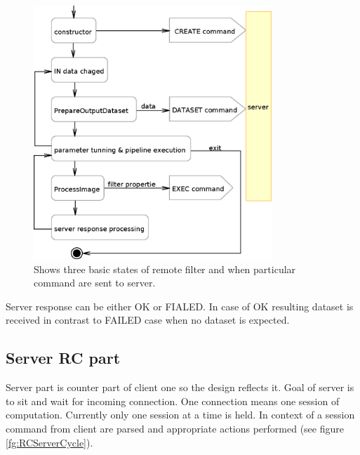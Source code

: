 \begin{figure}
    \centering
    \includegraphics[width=0.8\textwidth]{data/RCClientCycle}
    \caption[Remote Medv4D filter]{Shows three basic states of remote filter and when particular command are sent to server.}
    \label{fg:RCClientCycle}
\end{figure}

Server response can be either OK or FIALED.
In case of OK resulting dataset is received in contrast to FAILED case when no dataset is expected.

\subsection{Server RC part}

Server part is counter part of client one so the design reflects it.
Goal of server is to sit and wait for incoming connection.
One connection means one session of computation.
Currently only one session at a time is held.
In context of a session command from client are parsed and appropriate actions performed (see figure \ref{fg:RCServerCycle}).

